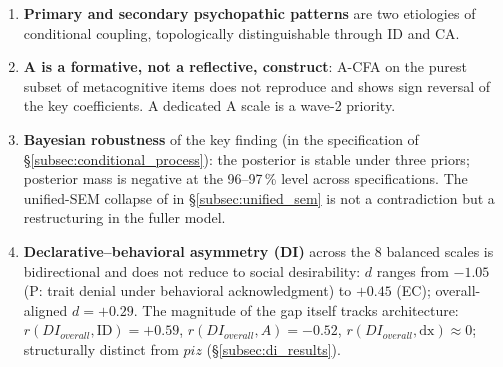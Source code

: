 \begin{enumerate}
    \item \textbf{Primary and secondary psychopathic patterns} are two etiologies of conditional coupling, topologically distinguishable through ID and CA.
    \item \textbf{A is a formative, not a reflective, construct}: A-CFA on the purest subset of metacognitive items does not reproduce \IMM{} and shows sign reversal of the key coefficients. A dedicated A scale is a wave-2 priority.
    \item \textbf{Bayesian robustness} of the key \IMM{} finding (in the specification of §\ref{subsec:conditional_process}): the posterior is stable under three priors; posterior mass is negative at the 96--97\,\% level across specifications. The unified-SEM collapse of \IMM{} in §\ref{subsec:unified_sem} is not a contradiction but a restructuring in the fuller model.
    \item \textbf{Declarative--behavioral asymmetry (DI)} across the 8 balanced scales is bidirectional and does not reduce to social desirability: $d$ ranges from $-1.05$ (P: trait denial under behavioral acknowledgment) to $+0.45$ (EC); overall-aligned $d{=}{+}0.29$. The magnitude of the gap itself tracks architecture: $r(DI_{overall}, \text{ID}){=}{+}0.59$, $r(DI_{overall}, A){=}{-}0.52$, $r(DI_{overall}, \text{dx}){\approx}0$; structurally distinct from $piz$ (§\ref{subsec:di_results}).
\end{enumerate}
